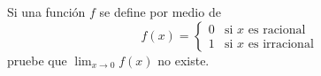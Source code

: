 \setcounter{enumi}{26}
\item Si una función $f$ se define por medio de 
$$f(x) = \begin{cases} 0 & \text{si } x \text{ es racional} \\ 1 & \text{si } x \text{ es irracional} \end{cases}$$
pruebe que $\lim_{x \to 0} f(x)$ no existe.
